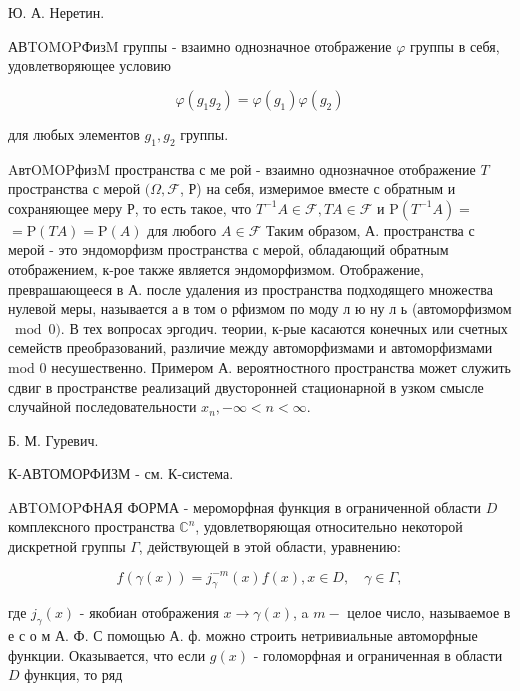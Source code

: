 \documentclass[10pt]{article}
\begin{document}
Ю. А. Неретин.



АВTOMOPФизM группы - взаимно однозначное отображение $\varphi$ группы в себя, удовлетворяющее условию



\[

\varphi\left(g_{1} g_{2}\right)=\varphi\left(g_{1}\right) \varphi\left(g_{2}\right)

\]



для любых элементов $g_{1}, g_{2}$ группы.



AвтOMOPфизM пространства с ме рой - взаимно однозначное отображение $T$ пространства с мерой $(\Omega, \mathscr{F}$, Р) на себя, измеримое вместе с обратным и сохраняющее меру Р, то есть такое, что $T^{-1} A \in \mathscr{F}, T A \in \mathscr{\mathcal { F }}$ и $\mathrm{P}\left(T^{-1} A\right)=$ $=\mathrm{P}(T A)=\mathrm{P}(A)$ для любого $A \in \mathscr{F}$ Таким образом, А. пространства с мерой - это эндоморфизм пространства с мерой, обладающий обратным отображением, к-рое также является эндоморфизмом. Отображение, преврашающееся в А. после удаления из пространства подходящего множества нулевой меры, называется а в том о рфизмом по моду л ю ну л ь (автоморфизмом $\bmod 0)$. В тех вопросах эргодич. теории, к-рые касаются конечных или счетных семейств преобразований, различие между автоморфизмами и автоморфизмами mod 0 несушественно. Примером А. вероятностного пространства может служить сдвиг в пространстве реализаций двусторонней стационарной в узком смысле случайной последовательности $x_{n},-\infty<n<\infty$.



Б. М. Гуревич.



К-АВТОМОРФИЗМ - см. К-система.



AВTOMOPФНАЯ ФОРМА - мероморфная функция в ограниченной области $D$ комплексного пространства $\mathbb{C}^{n}$, удовлетворяющая относительно некоторой дискретной группы $\Gamma$, действующей в этой области, уравнению:



\[

f(\gamma(x))=j_{\gamma}^{-m}(x) f(x), x \in D, \quad \gamma \in \Gamma,

\]



где $j_{\gamma}(x)$ - якобиан отображения $x \rightarrow \gamma(x)$, a $m-$ целое число, называемое в е с о м А. Ф. С помощью А. ф. можно строить нетривиальные автоморфные функции. Оказывается, что если $g(x)$ - голоморфная и ограниченная в области $D$ функция, то ряд
\end{document}
